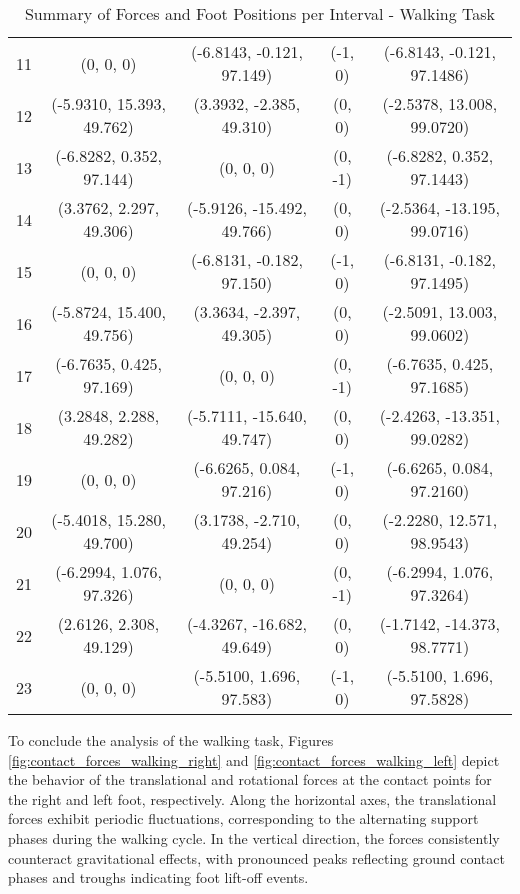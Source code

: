 \documentclass[main.tex]{subfiles}
\begin{document}
\begin{sloppypar}
\begin{table}[H]
{\begin{tabular}{c|c|c|c|c}
            11 & (0, 0, 0) & (-6.8143, -0.121, 97.149) & (-1, 0) & (-6.8143, -0.121, 97.1486) \\
            12 & (-5.9310, 15.393, 49.762) & (3.3932, -2.385, 49.310) & (0, 0) & (-2.5378, 13.008, 99.0720) \\
            13 & (-6.8282, 0.352, 97.144) & (0, 0, 0) & (0, -1) & (-6.8282, 0.352, 97.1443) \\
            14 & (3.3762, 2.297, 49.306) & (-5.9126, -15.492, 49.766) & (0, 0) & (-2.5364, -13.195, 99.0716) \\
            15 & (0, 0, 0) & (-6.8131, -0.182, 97.150) & (-1, 0) & (-6.8131, -0.182, 97.1495) \\
            16 & (-5.8724, 15.400, 49.756) & (3.3634, -2.397, 49.305) & (0, 0) & (-2.5091, 13.003, 99.0602) \\
            17 & (-6.7635, 0.425, 97.169) & (0, 0, 0) & (0, -1) & (-6.7635, 0.425, 97.1685) \\
            18 & (3.2848, 2.288, 49.282) & (-5.7111, -15.640, 49.747) & (0, 0) & (-2.4263, -13.351, 99.0282) \\
            19 & (0, 0, 0) & (-6.6265, 0.084, 97.216) & (-1, 0) & (-6.6265, 0.084, 97.2160) \\
            20 & (-5.4018, 15.280, 49.700) & (3.1738, -2.710, 49.254) & (0, 0) & (-2.2280, 12.571, 98.9543) \\
            21 & (-6.2994, 1.076, 97.326) & (0, 0, 0) & (0, -1) & (-6.2994, 1.076, 97.3264) \\
            22 & (2.6126, 2.308, 49.129) & (-4.3267, -16.682, 49.649) & (0, 0) & (-1.7142, -14.373, 98.7771) \\
            23 & (0, 0, 0) & (-5.5100, 1.696, 97.583) & (-1, 0) & (-5.5100, 1.696, 97.5828) \\
            \hline
        \end{tabular}
    }
    \caption{Summary of Forces and Foot Positions per Interval - Walking Task}
    \label{tab:forces_walking}
\end{table}      
To conclude the analysis of the walking task, Figures \ref{fig:contact_forces_walking_right} and \ref{fig:contact_forces_walking_left} depict the behavior of the translational and rotational forces at the contact points for the right and left foot, respectively. Along the horizontal axes, the translational forces exhibit periodic fluctuations, corresponding to the alternating support phases during the walking cycle. In the vertical direction, the forces consistently counteract gravitational effects, with pronounced peaks reflecting ground contact phases and troughs indicating foot lift-off events.

\end{sloppypar}
\end{document}
